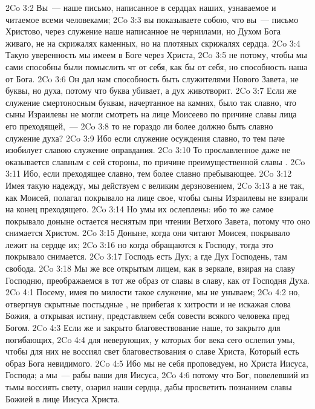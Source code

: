 \vs 2Co 3:2 Вы~--- наше письмо, написанное в сердцах наших, узнаваемое и читаемое всеми человеками;
\vs 2Co 3:3 вы показываете собою, что вы~--- письмо Христово, через служение наше написанное не чернилами, но Духом Бога живаго, не на скрижалях каменных, но на плотяных скрижалях сердца.
\vs 2Co 3:4 Такую уверенность мы имеем в Боге через Христа,
\vs 2Co 3:5 не потому, чтобы мы сами способны были помыслить чт от себя, как бы от себя, но способность наша от Бога.
\vs 2Co 3:6 Он дал нам способность быть служителями Нового Завета, не буквы, но духа, потому что буква убивает, а дух животворит.
\vs 2Co 3:7 Если же служение смертоносным буквам, начертанное на камнях, было так славно, что сыны Израилевы не могли смотреть на лице Моисеево по причине славы лица его преходящей,~---
\vs 2Co 3:8 то не гораздо ли более должно быть славно служение духа?
\vs 2Co 3:9 Ибо если служение осуждения славно, то тем паче изобилует славою служение оправдания.
\vs 2Co 3:10 То прославленное даже не оказывается славным с сей стороны, по причине преимущественной славы .
\vs 2Co 3:11 Ибо, если преходящее славно, тем более славно пребывающее.
\vs 2Co 3:12 Имея такую надежду, мы действуем с великим дерзновением,
\vs 2Co 3:13 а не так, как Моисей,  полагал покрывало на лице свое, чтобы сыны Израилевы не взирали на конец преходящего.
\vs 2Co 3:14 Но умы их ослеплены: ибо то же самое покрывало доныне остается неснятым при чтении Ветхого Завета, потому что оно снимается Христом.
\vs 2Co 3:15 Доныне, когда они читают Моисея, покрывало лежит на сердце их;
\vs 2Co 3:16 но когда обращаются к Господу, тогда это покрывало снимается.
\vs 2Co 3:17 Господь есть Дух; а где Дух Господень, там свобода.
\vs 2Co 3:18 Мы же все открытым лицем, как в зеркале, взирая на славу Господню, преображаемся в тот же образ от славы в славу, как от Господня Духа.
\vs 2Co 4:1 Посему, имея по милости  такое служение, мы не унываем;
\vs 2Co 4:2 но, отвергнув скрытные постыдные , не прибегая к хитрости и не искажая слова Божия, а открывая истину, представляем себя совести всякого человека пред Богом.
\vs 2Co 4:3 Если же и закрыто благовествование наше, то закрыто для погибающих,
\vs 2Co 4:4 для неверующих, у которых бог века сего ослепил умы, чтобы для них не воссиял свет благовествования о славе Христа, Который есть образ Бога невидимого.
\vs 2Co 4:5 Ибо мы не себя проповедуем, но Христа Иисуса, Господа; а мы~--- рабы ваши для Иисуса,
\vs 2Co 4:6 потому что Бог, повелевший из тьмы воссиять свету, озарил наши сердца, дабы просветить  познанием славы Божией в лице Иисуса Христа.
